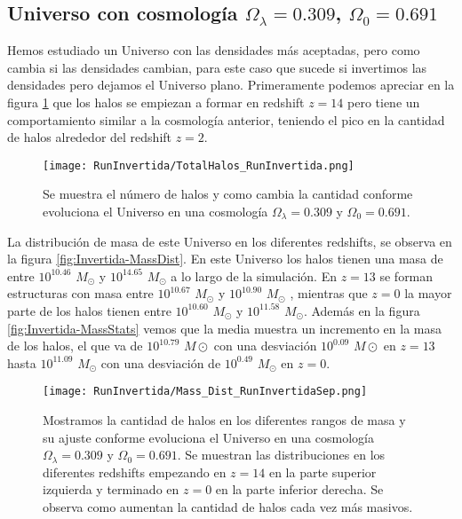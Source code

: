 \subsection{Universo con cosmología  \texorpdfstring{$\Omega_\lambda = 0.309$, $\Omega_0 = 0.691$ }{Omega lambda = 0.309, Omega 0 = 0.691} }
Hemos estudiado un Universo con las densidades más aceptadas, pero como cambia si las densidades cambian, para este caso que sucede si invertimos las densidades pero dejamos el Universo plano. Primeramente podemos apreciar en la figura \ref{fig:Invertida-TotalHalos} que los halos se empiezan a formar en redshift $z=14$ pero tiene un comportamiento similar a la cosmología anterior, teniendo el pico en la cantidad de halos alrededor del redshift $z=2$. 

\begin{figure}[H]
    \centering
    \texttt{[image: RunInvertida/TotalHalos\_RunInvertida.png]}
    \caption[Evolución del número de halos en un Universo $\Omega_\lambda = 0.309 $, $\Omega_0 = 0.691$]{\footnotesize Se muestra el número de halos y como cambia la cantidad conforme evoluciona el Universo en una cosmología $\Omega_\lambda = 0.309 $ y $\Omega_0 = 0.691$.}    
    \label{fig:Invertida-TotalHalos}
\end{figure}

La distribución de masa de este Universo en los diferentes redshifts, se observa en la figura \ref{fig:Invertida-MassDist}. En este Universo los halos tienen una masa de entre $10^{10.46}$ $M_\odot$ y $10^{14.65}$ $M_\odot$ a lo largo de la simulación. En $z=13$ se forman estructuras con masa entre $10^{10.67}$ $M_\odot$ y $10^{10.90}$ $M_\odot$ , mientras que $z=0$ la mayor parte de los halos tienen entre $10^{10.60}$ $M_\odot$ y $10^{11.58}$ $M_\odot$. Además en la figura \ref{fig:Invertida-MassStats} vemos que la media muestra un incremento en la masa de los halos, el que va de $10^{10.79}$ $M\odot$ con una desviación $10^{0.09}$ $M\odot$ en $z=13$ hasta $10^{11.09}$ $M_\odot$ con una desviación de $10^{0.49}$ $M_\odot$ en $z=0$. 

\begin{figure}[H]
    \centering
    \texttt{[image: RunInvertida/Mass\_Dist\_RunInvertidaSep.png]}
    \caption[Distribución de masa]{\footnotesize Mostramos la cantidad de halos en los diferentes rangos de masa y su ajuste conforme evoluciona el Universo en una cosmología $\Omega_\lambda = 0.309 $ y $\Omega_0 = 0.691$. Se muestran las distribuciones en los diferentes redshifts empezando en $z=14$ en la parte superior izquierda y terminado en $z=0$ en la parte inferior derecha. Se observa como aumentan la cantidad de halos cada vez más masivos.}
    \label{fig:Invertida-MassDistSep}
\end{figure}

